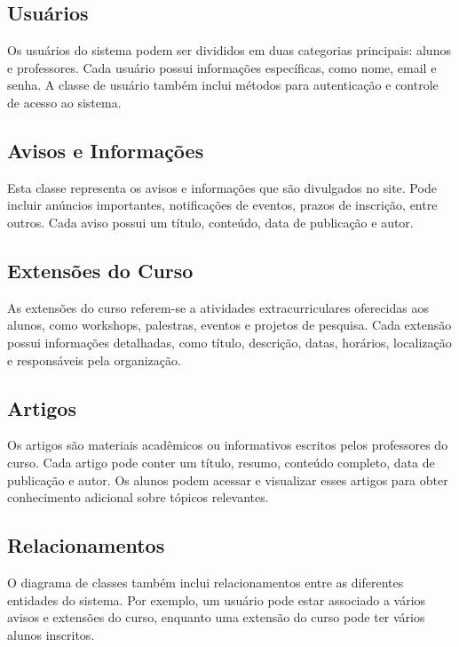 \documentclass[a4paper,12pt]{report}
\begin{document}
\subsection{Usuários}
 
Os usuários do sistema podem ser divididos em duas categorias principais: alunos e professores. Cada usuário possui informações específicas, como nome, email e senha. A classe de usuário também inclui métodos para autenticação e controle de acesso ao sistema.
 
\subsection{Avisos e Informações}
 
Esta classe representa os avisos e informações que são divulgados no site. Pode incluir anúncios importantes, notificações de eventos, prazos de inscrição, entre outros. Cada aviso possui um título, conteúdo, data de publicação e autor.
 
\subsection{Extensões do Curso}
 
As extensões do curso referem-se a atividades extracurriculares oferecidas aos alunos, como workshops, palestras, eventos e projetos de pesquisa. Cada extensão possui informações detalhadas, como título, descrição, datas, horários, localização e responsáveis pela organização.
 
\subsection{Artigos}
 
Os artigos são materiais acadêmicos ou informativos escritos pelos professores do curso. Cada artigo pode conter um título, resumo, conteúdo completo, data de publicação e autor. Os alunos podem acessar e visualizar esses artigos para obter conhecimento adicional sobre tópicos relevantes.
 
\subsection{Relacionamentos}
 
O diagrama de classes também inclui relacionamentos entre as diferentes entidades do sistema. Por exemplo, um usuário pode estar associado a vários avisos e extensões do curso, enquanto uma extensão do curso pode ter vários alunos inscritos.
 
\end{document}
